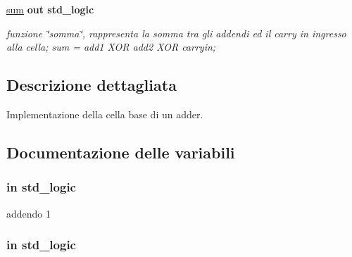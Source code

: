 \begin{DoxyCompactItemize}
\hyperlink{group___base_cell_ga0d9fc1b21b42422b12d68ad73ca8ef13}{sum}  {\bfseries {\bfseries \textcolor{vhdlchar}{out}\textcolor{vhdlchar}{ }}} {\bfseries \textcolor{vhdlchar}{std\+\_\+logic}\textcolor{vhdlchar}{ }} 
\begin{DoxyCompactList}\small\item\em funzione \char`\"{}somma\char`\"{}, rappresenta la somma tra gli addendi ed il carry in ingresso alla cella; sum = add1 X\+O\+R add2 X\+O\+R carryin; \end{DoxyCompactList}\end{DoxyCompactItemize}


\subsection{Descrizione dettagliata}
Implementazione della cella base di un adder. 



\subsection{Documentazione delle variabili}
\hypertarget{group___base_cell_ga2b16ee1ce0d8ffb8f85ccea13f8ba38d}{
\subsubsection[{add1}]{ {\bfseries \textcolor{vhdlchar}{in}\textcolor{vhdlchar}{ }} {\bfseries \textcolor{vhdlchar}{std\+\_\+logic}\textcolor{vhdlchar}{ }} \hspace{0.3cm}{\ttfamily [Port]}}}\label{group___base_cell_ga2b16ee1ce0d8ffb8f85ccea13f8ba38d}


addendo 1 

\hypertarget{group___base_cell_gac3ebb689e34fc5e7657726b18d8b5369}{
\subsubsection[{add2}]{ {\bfseries \textcolor{vhdlchar}{in}\textcolor{vhdlchar}{ }} {\bfseries \textcolor{vhdlchar}{std\+\_\+logic}\textcolor{vhdlchar}{ }} \hspace{0.3cm}{\ttfamily [Port]}}}\label{group___base_cell_gac3ebb689e34fc5e7657726b18d8b5369}


